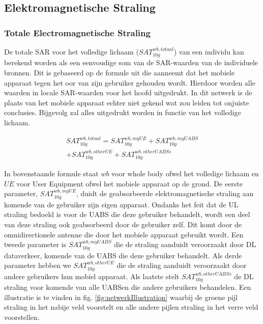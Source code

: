 \documentclass[twocolumn]{phdsymp_dutch}
\begin{document}
\subsection{Elektromagnetische Straling}
\subsubsection{Totale Electromagnetische Straling}
De totale \gls{SAR} voor het volledige lichaam ($SAT^{wb,totaal}_{10g}$) van een individu 
kan berekend worden als een eenvoudige som van de \gls{SAR}-waarden van de individuele bronnen. 
Dit is gebaseerd op de formule uit \cite{J17_kuehn2019modelling} die aanneemt dat het mobiele apparaat 
tegen het oor van zijn gebruiker gehouden wordt. Hierdoor worden alle waarden in locale \gls{SAR}-waarden voor het hoofd uitgedrukt.
In dit netwerk is de plaats van het mobiele apparaat echter  niet  gekend wat zou leiden tot onjuiste conclusies. Bijgevolg 
zal alles uitgedrukt worden in functie van het volledige lichaam.

\begin{equation} 
\begin{aligned}
SAT^{wb,totaal}_{10g} = SAT^{wb,myUE}_{10g} +  SAT^{wb,myUABS}_{10g} \\
+ SAT^{wb,otherUE}_{10g} + SAT^{wb,otherUABSs}_{10g}
\end{aligned}
\label{eq:overallSARwb}
\end{equation}

In bovenstaande formule staat $wb$ voor whole body ofwel het volledige lichaam en $UE$ voor User Equipment ofwel het mobiele apparaat op de grond.
De eerste parameter, $SAT^{wb,myUE}_{10g}$, duidt de geabsorbeerde elektromagnetische straling aan komende van de gebruiker zijn eigen apparaat.
Ondanks het feit dat de \gls{UL} straling bedoeld is voor de \gls{UABS} die deze gebruiker behandelt,
wordt een deel van deze straling ook geabsorbeerd door de gebruiker zelf.
Dit komt door de omnidirectionele antenne die door het mobiele apparaat gebruikt wordt.
Een tweede parameter is $SAT^{wb,myUABS}_{10g}$ die de straling aanduidt veroorzaakt door \gls{DL} dataverkeer, komende van de \gls{UABS} die deze gebruiker behandelt.
Als derde parameter hebben we $SAT^{wb,otherUE}_{10g}$ die de straling aanduidt veroorzaakt door andere gebruikers hun mobiel apparaat.
Als laatste stelt $SAT^{wb,otherUABSs}_{10g}$ de \gls{DL} straling voor komende van alle \gls{UABS}en die andere gebruikers behandelen.
Een illustratie is te vinden in fig. \ref{fig:netwerkIllustration} waarbij de groene pijl straling in het nabije veld voorstelt en alle andere 
pijlen straling in het verre veld voorstellen.
\end{document}
